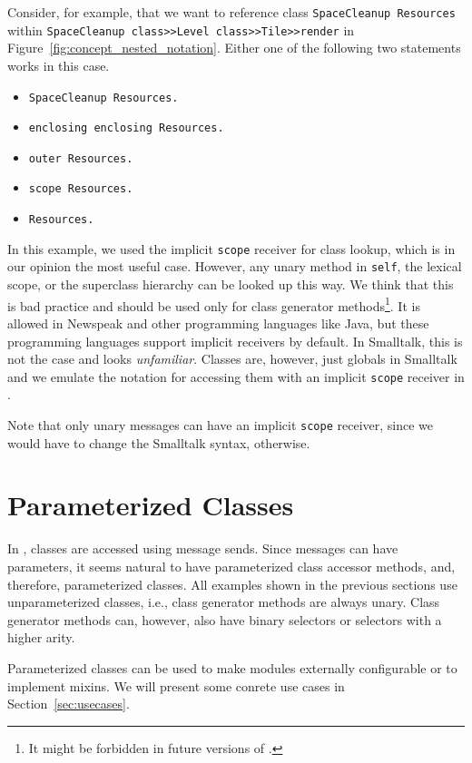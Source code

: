 Consider, for example, that we want to reference class \texttt{SpaceCleanup Resources} within \texttt{SpaceCleanup class>>Level class>>Tile>>render} in Figure~\ref{fig:concept_nested_notation}. Either one of the following two statements works in this case.

\begin{itemize}
	\item \texttt{SpaceCleanup Resources.}
	\item \texttt{enclosing enclosing Resources.}
	\item \texttt{outer Resources.}
	\item \texttt{scope Resources.}
	\item \texttt{Resources.}
\end{itemize}

In this example, we used the implicit \texttt{scope} receiver for class lookup, which is in our opinion the most useful case. However, any unary method in \texttt{self}, the lexical scope, or the superclass hierarchy can be looked up this way. We think that this is bad practice and should be used only for class generator methods\footnote{It might be forbidden in future versions of \msname.}. It is allowed in Newspeak and other programming languages like Java, but these programming languages support implicit receivers by default. In Smalltalk, this is not the case and looks \emph{unfamiliar}. Classes are, however, just globals in Smalltalk and we emulate the notation for accessing them with an implicit \texttt{scope} receiver in \msname. 

Note that only unary messages can have an implicit \texttt{scope} receiver, since we would have to change the Smalltalk syntax, otherwise.

\section{Parameterized Classes}
\label{sec:conz_param_cls}
In \msname, classes are accessed using message sends. Since messages can have parameters, it seems natural to have parameterized class accessor methods, and, therefore, parameterized classes. All examples shown in the previous sections use unparameterized classes, i.e., class generator methods are always unary. Class generator methods can, however, also have binary selectors or selectors with a higher arity. %

Parameterized classes can be used to make modules externally configurable or to implement mixins. We will present some conrete use cases in Section~\ref{sec:usecases}.

